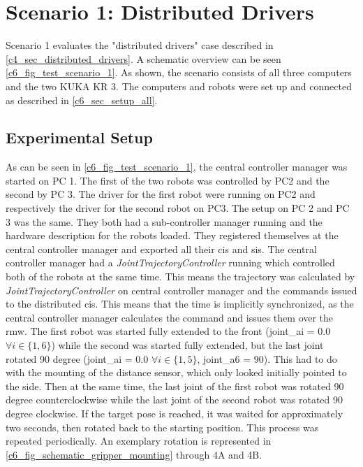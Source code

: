 \section{Scenario 1: Distributed Drivers}
Scenario 1 evaluates the "distributed drivers" case described in \autoref{c4_sec_distributed_drivers}. A schematic overview can be seen \autoref{c6_fig_test_scenario_1}. As shown, the scenario consists of all three computers and the two KUKA KR 3. The computers and robots were set up and connected as described in \autoref{c6_sec_setup_all}.\newline


\subsection{Experimental Setup}
As can be seen in \autoref{c6_fig_test_scenario_1}, the central controller manager was started on PC 1. The first of the two robots was controlled by PC2 and the second by PC 3. The driver for the first robot were running on PC2 and respectively the driver for the second robot on PC3. The setup on PC 2 and PC 3 was the same. They both had a sub-controller manager running and the hardware description for the robots loaded. They registered themselves at the central controller manager and exported all their \glspl{ci} and \glspl{si}. The central controller manager had a \textit{JointTrajectoryController} running which controlled both of the robots at the same time. This means the trajectory was calculated by \textit{JointTrajectoryController} on central controller manager and the commands issued to the distributed \glspl{ci}. This means that the time is implicitly synchronized, as the central controller manager calculates the command and issues them over the \gls{rmw}.\newline
The first robot was started fully extended to the front (joint\_ai = 0.0 $\forall i\in\{1,6\}$) while the second was started fully extended, but the last joint rotated 90 degree (joint\_ai = 0.0 $\forall i\in\{1,5\}$, joint\_a6 = 90). This had to do with the mounting of the distance sensor, which only looked initially pointed to the side. Then at the same time, the last joint of the first robot was rotated 90 degree counterclockwise while the last joint of the second robot was rotated 90 degree clockwise. If the target pose is reached, it was waited for approximately two seconds, then rotated back to the starting position. This process was repeated periodically. An exemplary rotation is represented in \autoref{c6_fig_schematic_gripper_mounting} through 4A and 4B. 
